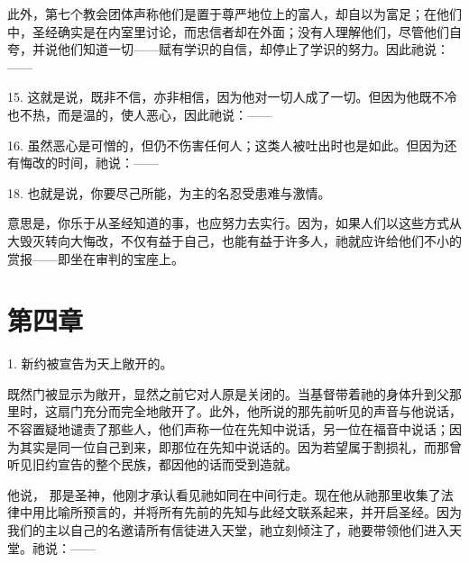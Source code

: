 此外，第七个教会团体声称他们是置于尊严地位上的富人，却自以为富足；在他们中，圣经确实是在内室里讨论，而忠信者却在外面；没有人理解他们，尽管他们自夸，并说他们知道一切——赋有学识的自信，却停止了学识的努力。因此祂说：——\par

15.  这就是说，既非不信，亦非相信，因为他对一切人成了一切。但因为他既不冷也不热，而是温的，使人恶心，因此祂说：——\par

16.  虽然恶心是可憎的，但仍不伤害任何人；这类人被吐出时也是如此。但因为还有悔改的时间，祂说：——\par

18.  也就是说，你要尽己所能，为主的名忍受患难与激情。\par

 意思是，你乐于从圣经知道的事，也应努力去实行。因为，如果人们以这些方式从大毁灭转向大悔改，不仅有益于自己，也能有益于许多人，祂就应许给他们不小的赏报——即坐在审判的宝座上。\par


\section{第四章}

1.  新约被宣告为天上敞开的。\par

 既然门被显示为敞开，显然之前它对人原是关闭的。当基督带着祂的身体升到父那里时，这扇门充分而完全地敞开了。此外，他所说的那先前听见的声音与他说话，不容置疑地谴责了那些人，他们声称一位在先知中说话，另一位在福音中说话；因为其实是同一位自己到来，即那位在先知中说话的。因为若望属于割损礼，而那曾听见旧约宣告的整个民族，都因他的话而受到造就。\par

 他说， 那是圣神，他刚才承认看见祂如同在中间行走。现在他从祂那里收集了法律中用比喻所预言的，并将所有先前的先知与此经文联系起来，并开启圣经。因为我们的主以自己的名邀请所有信徒进入天堂，祂立刻倾注了，祂要带领他们进入天堂。祂说：——\par

